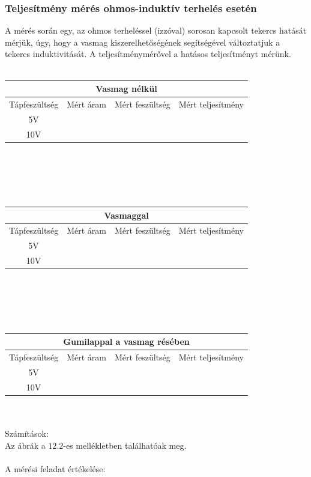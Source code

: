 \documentclass[10pt,a4paper]{article}
\begin{document}
			 \subsubsection{Teljesítmény mérés ohmos-induktív terhelés esetén}
A mérés során egy, az ohmos terheléssel (izzóval) sorosan kapcsolt tekercs hatását mérjük, úgy, hogy a vasmag kiszerelhetőségének segítségével változtatjuk a tekercs induktivitását.
A teljesítménymérővel a hatásos teljesítményt mérünk.\\\\
\begin{tabular}{|c|c|c|c|}
\hline 
\multicolumn{4}{|c|}{Vasmag nélkül} \\ 
\hline 
Tápfeszültség & Mért áram & Mért feszültség & Mért teljesítmény \\ 
\hline 
5V &  &  &  \\ 
\hline 
10V &  &  &  \\ 
\hline 
\end{tabular} \\\\
\\\\ 
\begin{tabular}{|c|c|c|c|}
\hline 
\multicolumn{4}{|c|}{Vasmaggal} \\ 
\hline 
Tápfeszültség & Mért áram & Mért feszültség & Mért teljesítmény \\ 
\hline 
5V &  &  &  \\ 
\hline 
10V &  &  &  \\ 
\hline 
\end{tabular}
\\\\
\\\\
\begin{tabular}{|c|c|c|c|}
\hline 
\multicolumn{4}{|c|}{Gumilappal a vasmag résében} \\ 
\hline 
Tápfeszültség & Mért áram & Mért feszültség & Mért teljesítmény \\ 
\hline 
5V &  &  &  \\ 
\hline 
10V &  &  &  \\ 
\hline 
\end{tabular}
\\\\
Számítások: 
\newpage
$$$$ $$$$ $$$$
Az ábrák a $12.2$-es mellékletben találhatóak meg.\\\\
A mérési feladat értékelése:$$$$ $$$$ $$$$
\end{document}
